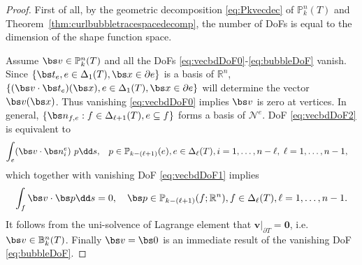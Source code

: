 \begin{proof}
First of all, by the geometric decomposition \eqref{eq:Pkvecdec} of $\mathbb P_k^n(T)$ and Theorem~\ref{thm:curlbubbletracespacedecomp}, %
the number of DoFs is equal to the dimension of the shape function space. 


Assume $\bs v\in\mathbb P_k^n(T)$ and all the DoFs \eqref{eq:vecbdDoF0}-\eqref{eq:bubbleDoF} vanish. Since $\{\bs t_{e}, e\in \Delta_{1}(T), {\bs x}\in\partial e\}$ is a basis of $\mathbb R^n$, $\{(\bs v\cdot \bs t_{e})({\bs x}), e\in \Delta_{1}(T), {\bs x}\in\partial e\}$ will determine the vector $\bs v({\bs x})$. Thus vanishing \eqref{eq:vecbdDoF0} implies $\bs v$ is zero at vertices. In general, $\{\bs n_{f,e}: f\in \Delta_{\ell+1}(T), e\subseteq f\}$ forms a basis of $\mathscr{N}^e$. DoF \eqref{eq:vecbdDoF2} is equivalent to 
\begin{align*}
\int_e (\bs v\cdot \bs n_i^e)\ p \dd s, &\quad  p\in \mathbb P_{k - (\ell +1)} (e), e\in \Delta_{\ell}(T), i=1,\ldots, n-\ell, \; \ell = 1,\ldots, n-1,
\end{align*}
which together with vanishing DoF \eqref{eq:vecbdDoF1} implies
\begin{equation*}
\int_f \bs v\cdot \bs p \dd s = 0, \quad  \bs p\in \mathbb P_{k - (\ell +1)} (f;\mathbb R^n), f\in \Delta_{\ell}(T),  \ell = 1,\ldots, n-1.
\end{equation*}
It follows from the uni-solvence of Lagrange element that $\boldsymbol{v}|_{\partial T}=\boldsymbol{0}$, i.e. $\bs v\in\mathbb B_k^n(T)$.
Finally $\bs v=\bs0$ is an immediate result of the vanishing DoF \eqref{eq:bubbleDoF}.
\end{proof}


